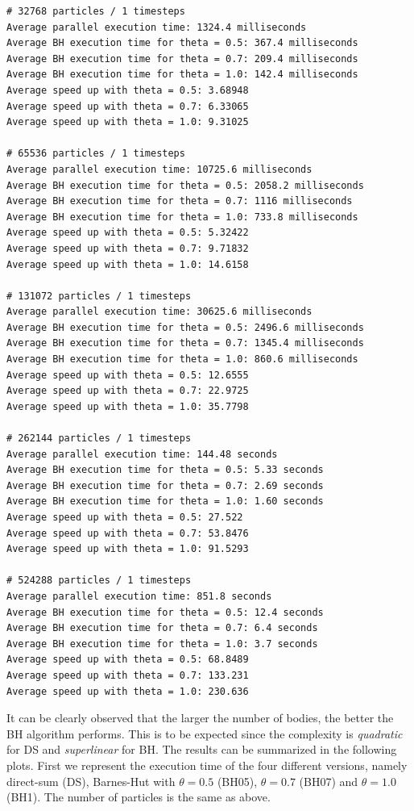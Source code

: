 \documentclass{article}
\begin{document}
\begin{boxA}
    \begin{verbatim}
# 32768 particles / 1 timesteps
Average parallel execution time: 1324.4 milliseconds
Average BH execution time for theta = 0.5: 367.4 milliseconds
Average BH execution time for theta = 0.7: 209.4 milliseconds
Average BH execution time for theta = 1.0: 142.4 milliseconds
Average speed up with theta = 0.5: 3.68948
Average speed up with theta = 0.7: 6.33065
Average speed up with theta = 1.0: 9.31025

# 65536 particles / 1 timesteps
Average parallel execution time: 10725.6 milliseconds
Average BH execution time for theta = 0.5: 2058.2 milliseconds
Average BH execution time for theta = 0.7: 1116 milliseconds
Average BH execution time for theta = 1.0: 733.8 milliseconds
Average speed up with theta = 0.5: 5.32422 
Average speed up with theta = 0.7: 9.71832
Average speed up with theta = 1.0: 14.6158

# 131072 particles / 1 timesteps
Average parallel execution time: 30625.6 milliseconds
Average BH execution time for theta = 0.5: 2496.6 milliseconds
Average BH execution time for theta = 0.7: 1345.4 milliseconds
Average BH execution time for theta = 1.0: 860.6 milliseconds
Average speed up with theta = 0.5: 12.6555
Average speed up with theta = 0.7: 22.9725
Average speed up with theta = 1.0: 35.7798

# 262144 particles / 1 timesteps
Average parallel execution time: 144.48 seconds
Average BH execution time for theta = 0.5: 5.33 seconds
Average BH execution time for theta = 0.7: 2.69 seconds
Average BH execution time for theta = 1.0: 1.60 seconds
Average speed up with theta = 0.5: 27.522
Average speed up with theta = 0.7: 53.8476
Average speed up with theta = 1.0: 91.5293

# 524288 particles / 1 timesteps
Average parallel execution time: 851.8 seconds
Average BH execution time for theta = 0.5: 12.4 seconds
Average BH execution time for theta = 0.7: 6.4 seconds
Average BH execution time for theta = 1.0: 3.7 seconds
Average speed up with theta = 0.5: 68.8489
Average speed up with theta = 0.7: 133.231
Average speed up with theta = 1.0: 230.636
    \end{verbatim}
\end{boxA}

\newpage It can be clearly observed that the larger the number of bodies, the better the BH algorithm performs. This is to be expected since the complexity is \textit{quadratic} for DS and \textit{superlinear} for BH. The results can be summarized in the following plots. First we represent the execution time of the four different versions, namely direct-sum (DS), Barnes-Hut with $\theta = 0.5$ (BH05), $\theta = 0.7$ (BH07) and $\theta = 1.0$ (BH1). The number of particles is the same as above.  
\end{document}
